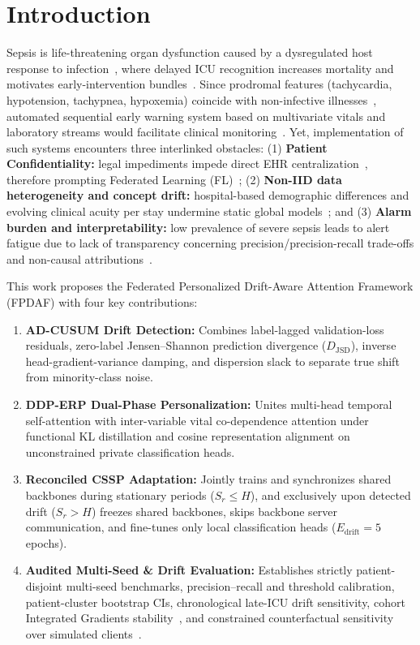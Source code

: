 \documentclass{llncs}
\begin{document}
\section{Introduction}

Sepsis is life-threatening organ dysfunction caused by a dysregulated host response to infection~\cite{21}, where delayed ICU recognition increases mortality and motivates early-intervention bundles~\cite{22}. Since prodromal features (tachycardia, hypotension, tachypnea, hypoxemia) coincide with non-infective illnesses~\cite{17,22}, automated sequential early warning system based on multivariate vitals and laboratory streams would facilitate clinical monitoring~\cite{5,23}. Yet, implementation of such systems encounters three interlinked obstacles: (1) \textbf{Patient Confidentiality:} legal impediments impede direct EHR centralization~\cite{6}, therefore prompting Federated Learning (FL)~\cite{15}; (2) \textbf{Non-IID data heterogeneity and concept drift:} hospital-based demographic differences and evolving clinical acuity per stay undermine static global models~\cite{2,7,16,25}; and (3) \textbf{Alarm burden and interpretability:} low prevalence of severe sepsis leads to alert fatigue due to lack of transparency concerning precision/precision-recall trade-offs and non-causal attributions~\cite{10,24}.

This work proposes the Federated Personalized Drift-Aware Attention Framework (FPDAF) with four key contributions:
\begin{enumerate}\setlength{\itemsep}{1pt}\setlength{\parskip}{0pt}
    \item \textbf{AD-CUSUM Drift Detection:} Combines label-lagged validation-loss residuals, zero-label Jensen--Shannon prediction divergence ($D_{\mathrm{JSD}}$), inverse head-gradient-variance damping, and dispersion slack to separate true shift from minority-class noise.
    \item \textbf{DDP-ERP Dual-Phase Personalization:} Unites multi-head temporal self-attention with inter-variable vital co-dependence attention under functional KL distillation and cosine representation alignment on unconstrained private classification heads.
    \item \textbf{Reconciled CSSP Adaptation:} Jointly trains and synchronizes shared backbones during stationary periods ($S_r \le H$), and exclusively upon detected drift ($S_r > H$) freezes shared backbones, skips backbone server communication, and fine-tunes only local classification heads ($E_{\mathrm{drift}}=5$ epochs).
    \item \textbf{Audited Multi-Seed \& Drift Evaluation:} Establishes strictly patient-disjoint multi-seed benchmarks, precision--recall and threshold calibration, patient-cluster bootstrap CIs, chronological late-ICU drift sensitivity, cohort Integrated Gradients stability~\cite{24}, and constrained counterfactual sensitivity over simulated clients~\cite{23}.
\end{enumerate}
\end{document}
